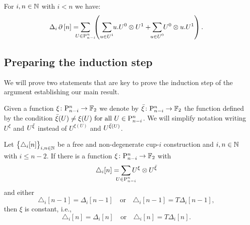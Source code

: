 \begin{proposition}\label{p:fact}
	For $i,n \in \mathbb{N}$ with $i < n$ we have:
	\[
	\Delta_i \bd \, [n] =
	\sum_{\mathclap{U \in \P_{n-i}^n}} \
	\left(\
	\sum_{\mathclap{u \in U^1}} u.U^0 \ot U^1 +
	\sum_{\mathclap{u \in U^0}} U^0 \ot u.U^1
	\right).
	\]
\end{proposition}

\subsection{Preparing the induction step}\label{ss:preparing}

We will prove two statements that are key to prove the induction step of the argument establishing our main result.

\begin{notation*}
	Given a function $\xi \colon \mathrm{P}_{n-i}^n \to {\mathbb{F}_2}$ we denote by ${\bar{\xi}} \colon \mathrm{P}_{n-i}^n \to {\mathbb{F}_2}$ the function defined by the condition ${\bar{\xi}}(U) \neq \xi(U) \text{ for all } U \in \mathrm{P}_{n-i}^n$.
	We will simplify notation writing $U^\xi$ and $U^{{\bar{\xi}}}$ instead of $U^{\xi(U)}$ and $U^{{\bar{\xi}}(U)}$.
\end{notation*}

\begin{lemma}\label{l:first nail}
	Let $\big\{ \triangle_i [n] \big\}_{i,n\in\mathbb{N}}$ be a free and non-degenerate \mbox{cup-$i$} construction and $i,n \in \mathbb{N}$ with $i \leq n-2$.
	If there is a function $\xi \colon \mathrm{P}_{n-i}^n \to {\mathbb{F}_2}$ with
	\begin{equation}\label{e:xi and barxi}
	\triangle_i [n] =
	\sum_{\mathclap{U \in \P_{n-i}^n}} U^{\xi} \ot U^{\barxi}
	\end{equation}
	and either
	\[
	\triangle_i [n-1] = \Delta_i [n-1]
	\quad \text{or} \quad
	\triangle_i [n-1] = T\Delta_i [n-1],
	\]
	then $\xi$ is constant, i.e.,
	\[
	\triangle_i [n] = \Delta_i [n]
	\quad \text{or} \quad
	\triangle_i [n] = T \Delta_i [n].
	\]
\end{lemma}

